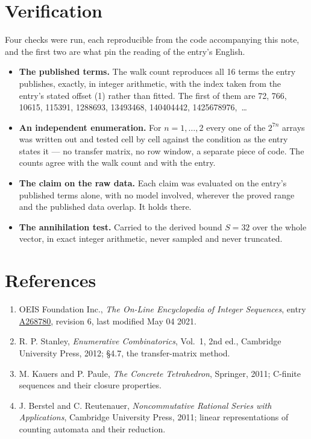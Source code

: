 \documentclass[11pt]{article}
\theoremstyle{definition}
\begin{document}
\section{Verification}

Four checks were run, each reproducible from the code accompanying this note, and the first two are what pin the reading of the entry's English.

\begin{itemize}

\item {\bfseries The published terms.} The walk count reproduces all 16 terms the entry publishes, exactly, in integer arithmetic, with the index taken from the entry's stated offset (1) rather than fitted. The first of them are 72, 766, 10615, 115391, 1288693, 13493468, 140404442, 1425678976,~\dots

\item {\bfseries An independent enumeration.} For $n = 1,\dots,2$ every one of the $2^{7n}$ arrays was written out and tested cell by cell against the condition as the entry states it --- no transfer matrix, no row window, a separate piece of code. The counts agree with the walk count and with the entry.

\item {\bfseries The claim on the raw data.} Each claim was evaluated on the entry's published terms alone, with no model involved, wherever the proved range and the published data overlap. It holds there.

\item {\bfseries The annihilation test.} Carried to the derived bound $S = 32$ over the whole vector, in exact integer arithmetic, never sampled and never truncated.

\end{itemize}

\section{References}

\begin{enumerate}

\item OEIS Foundation Inc., \emph{The On-Line Encyclopedia of Integer Sequences}, entry \href{https://oeis.org/A268780}{A268780}, revision 6, last modified May 04 2021.

\item R. P. Stanley, \emph{Enumerative Combinatorics}, Vol.~1, 2nd ed., Cambridge University Press, 2012; \S4.7, the transfer-matrix method.

\item M. Kauers and P. Paule, \emph{The Concrete Tetrahedron}, Springer, 2011; C-finite sequences and their closure properties.

\item J. Berstel and C. Reutenauer, \emph{Noncommutative Rational Series with Applications}, Cambridge University Press, 2011; linear representations of counting automata and their reduction.

\end{enumerate}
\end{document}
